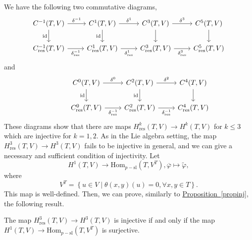 \documentclass[11pt, twoside]{article}
\begin{document}
We have the following two commutative diagrams, \[\begin{tikzcd}
	{C^{-1}(T,V)} & {C^1(T,V)} & {C^3(T,V)} & {C^5(T,V)} \\
	{C^{-1}_\mathrm{res}(T,V)} & {C^{1}_\mathrm{res}(T,V)} & {C^{3}_\mathrm{res}(T,V)} & {C^{5}_\mathrm{res}(T,V)}
	\arrow["{\delta^{-1}} ", from=1-1, to=1-2]
	\arrow["{\mathrm{id}}"', from=1-1, to=2-1]
	\arrow["{\delta^1} " ,from=1-2, to=1-3]
	\arrow["{\mathrm{id}}"', from=1-2, to=2-2]
	\arrow["{\delta^3} " ,from=1-3, to=1-4]
	\arrow[from=1-3, to=2-3]
	\arrow[from=1-4, to=2-4]
	\arrow["{\delta_\mathrm{res}^{-1}} "' ,from=2-1, to=2-2]
	\arrow["{\delta_\mathrm{res}^{1}} "',from=2-2, to=2-3]
	\arrow["{\delta_\mathrm{res}^{3}} "' ,from=2-3, to=2-4]
\end{tikzcd}\] and \[\begin{tikzcd}
	{} & {C^0(T,V)} & {C^2(T,V)} & {C^4(T,V)} \\
	& {C^{0}_\mathrm{res}(T,V)} & {C^{2}_\mathrm{res}(T,V)} & {C^{4}_\mathrm{res}(T,V)}
	\arrow["{\delta^{0}} ",from=1-2, to=1-3]
	\arrow["{\mathrm{id}}"', from=1-2, to=2-2]
	\arrow["{\delta^{2}} ",from=1-3, to=1-4]
	\arrow["{\mathrm{id}}"', from=1-3, to=2-3]
	\arrow[from=1-4, to=2-4]
	\arrow["{\delta_\mathrm{res}^{-1}} "',from=2-2, to=2-3]
	\arrow["{\delta_\mathrm{res}^{-1}} "',from=2-3, to=2-4]
\end{tikzcd}\] These diagrams show that there are maps $H^k_\mathrm{res}(T,V)\to H^k(T,V) $ for $k\leq 3$ which are injective for $k=1,2 $. As in the Lie algebra setting, the map $H^3_\mathrm{res}(T,V)\to H^3(T,V) $ fails to be injective in general, and we can give a  necessary and sufficient condition of injectivity. Let $$H^1(T,V)\to \mathrm{Hom}_{p-\mathrm{sl}}(T,V^T), \overline{\varphi}\mapsto \tilde{\varphi}, $$ where $$V^T=\left\{ u\in V\mid \theta(x,y)(u)=0, \forall x,y\in T\right\}.  $$ This map is well-defined. Then, we can prove, similarly to \hyperref[propinj]{Proposition~\ref*{propinj}}, the following result.

\begin{prop}
    The map $H^3_\mathrm{res}(T,V)\to H^3(T,V) $ is injective if and only if the map $H^1(T,V)\to \mathrm{Hom}_{p-\mathrm{sl}}(T,V^T) $ is surjective.
\end{prop}
\end{document}
